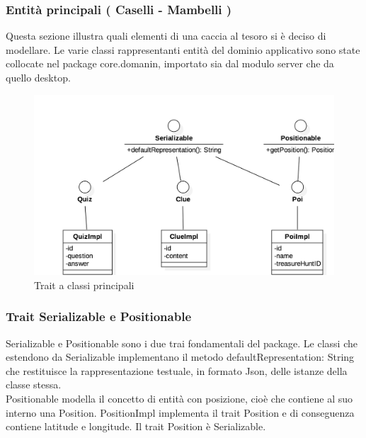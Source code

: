 \documentclass[12pt, italian]{article}
\begin{document}
\subsubsection{Entità principali ( Caselli - Mambelli )}
Questa sezione illustra quali elementi di una caccia al tesoro si è deciso di modellare.
Le varie classi rappresentanti entità del dominio applicativo sono state collocate nel package core.domanin, importato sia dal modulo server che da quello desktop.

\begin{figure}[H]
	\centering
	\includegraphics[width=1\textwidth]{img/diagram01.png}
	\caption{Trait a classi principali}
\end{figure}

\subsubsection*{Trait Serializable e Positionable}
Serializable e Positionable sono i due trai fondamentali del package.
Le classi che estendono da Serializable implementano il metodo defaultRepresentation: String che restituisce la rappresentazione testuale, in formato Json, delle istanze della classe stessa.\\
Positionable modella il concetto di entità con posizione, cioè che contiene al suo interno una Position. PositionImpl implementa il trait Position e di conseguenza contiene latitude e longitude. Il trait Position è Serializable.
\end{document}
